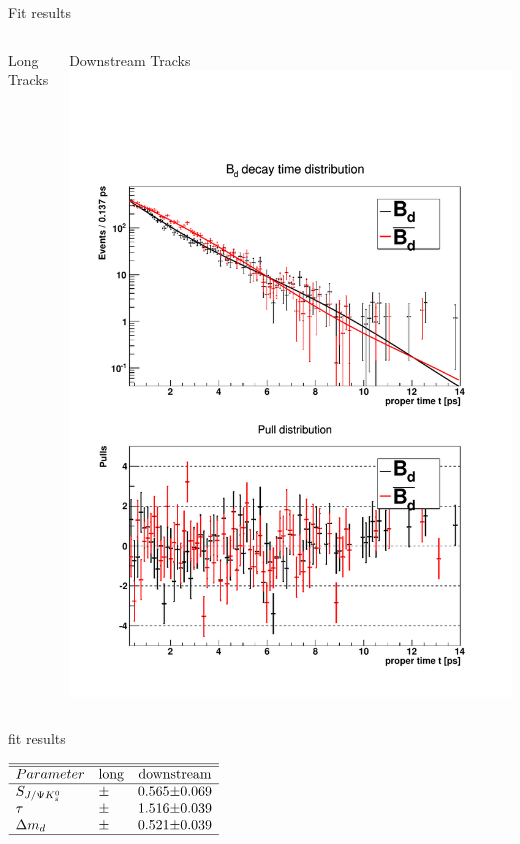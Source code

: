 \documentclass{beamer}
\newcommand{\SJPsi}{S_{J/\Psi K_s^0}}
\begin{document}
	
	\begin{frame}{Fit results}
	\begin{columns}
	\begin{block}{Long Tracks}
	\end{block}
	\begin{block}{Downstream Tracks}
	\includegraphics[width=\textwidth]{decay_distribution_ds}
	\end{block}
	\end{columns}

	\end{frame}
	
	\begin{frame}{fit results}
	\begin{center}
	$\begin{array}{l r@{\pm}l r@{\pm}l}
	\hline \hline
	Parameter & \multicolumn{2}{c}{\text{long}} & \multicolumn{2}{c}{\text{downstream}} \\ \hline
	\SJPsi     & & & 0.565 & 0.069 \\
	\tau       & & & 1.516 & 0.039 \\
	\Delta m_d & & & 0.521 & 0.039 \\
	\hline
	\end{array}$
	\end{center}
	\end{frame}
\end{document}
